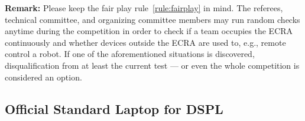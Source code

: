 
\textbf{Remark:} Please keep the fair play rule~\ref{rule:fairplay} in mind. The referees, technical committee,
        and organizing committee members may run random checks anytime during the competition in order to check if a team
        occupies the ECRA continuously and whether devices outside the ECRA are used to, e.g., remote control a robot.
        If one of the aforementioned situations is discovered, disqualification from at least the current test --- or
        even the whole competition is considered an option.


\subsection{Official Standard Laptop for DSPL}
\label{rule:osl_dspl}
%
%

